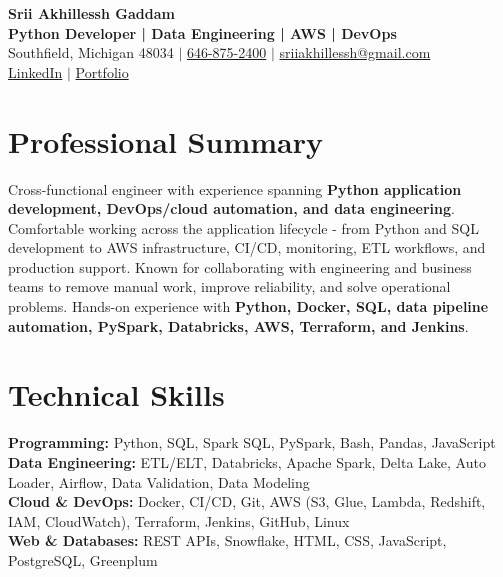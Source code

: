 \documentclass[letterpaper,10pt]{article}
\begin{document}
\fontsize{9.35pt}{10.45pt}\selectfont

\begin{center}
    {\LARGE \textbf{Srii Akhillessh Gaddam}} \\[-1pt]
    \textbf{Python Developer | Data Engineering | AWS | DevOps} \\[2pt]
    Southfield, Michigan 48034 $|$
    \href{tel:6468752400}{646-875-2400} $|$
    \href{mailto:sriiakhillessh@gmail.com}{sriiakhillessh@gmail.com} \\[1pt]
    \href{https://www.linkedin.com/in/srii-akhiilessh-gaddam-b48668191/}{LinkedIn} $|$
    \href{https://sriiakhillesshg.github.io/portfolio/}{Portfolio}
\end{center}
\vspace{-8pt}

\section{Professional Summary}
\small{Cross-functional engineer with experience spanning \textbf{Python application development, DevOps/cloud automation, and data engineering}. Comfortable working across the application lifecycle - from Python and SQL development to AWS infrastructure, CI/CD, monitoring, ETL workflows, and production support. Known for collaborating with engineering and business teams to remove manual work, improve reliability, and solve operational problems. Hands-on experience with \textbf{Python, Docker, SQL, data pipeline automation, PySpark, Databricks, AWS, Terraform, and Jenkins}.}

\section{Technical Skills}
\small{
\textbf{Programming:} Python, SQL, Spark SQL, PySpark, Bash, Pandas, JavaScript \\
\textbf{Data Engineering:} ETL/ELT, Databricks, Apache Spark, Delta Lake, Auto Loader, Airflow, Data Validation, Data Modeling \\
\textbf{Cloud \& DevOps:} Docker, CI/CD, Git, AWS (S3, Glue, Lambda, Redshift, IAM, CloudWatch), Terraform, Jenkins, GitHub, Linux \\
\textbf{Web \& Databases:} REST APIs, Snowflake, HTML, CSS, JavaScript, PostgreSQL, Greenplum
}
\end{document}
